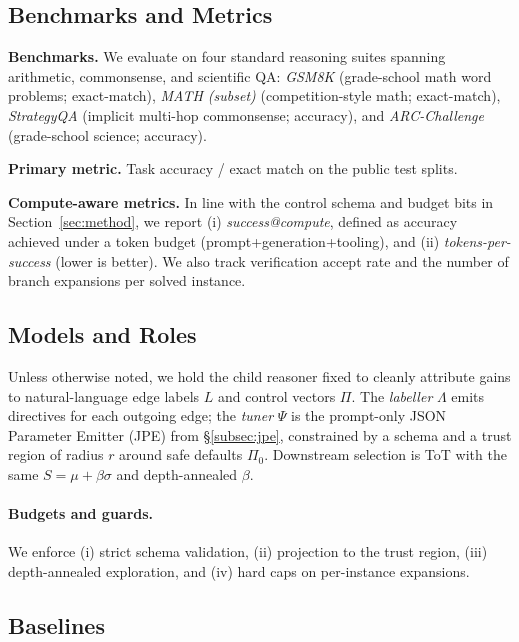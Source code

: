\documentclass{article}
\theoremstyle{plain}
\theoremstyle{definition}
\theoremstyle{remark}
\begin{document}
\subsection{Benchmarks and Metrics}

\textbf{Benchmarks.} We evaluate on four standard reasoning suites spanning arithmetic, commonsense, and scientific QA: 
\emph{GSM8K} (grade-school math word problems; exact-match), 
\emph{MATH (subset)} (competition-style math; exact-match), 
\emph{StrategyQA} (implicit multi-hop commonsense; accuracy), and 
\emph{ARC-Challenge} (grade-school science; accuracy).

\noindent\textbf{Primary metric.} Task accuracy / exact match on the public test splits.

\noindent\textbf{Compute-aware metrics.} In line with the control schema and budget bits in Section~\ref{sec:method}, 
we report (i) \emph{success@compute}, defined as accuracy achieved under a token budget (prompt{+}generation{+}tooling), and 
(ii) \emph{tokens-per-success} (lower is better). We also track verification accept rate and the number of branch expansions per solved instance.

\subsection{Models and Roles}

Unless otherwise noted, we hold the child reasoner fixed to cleanly attribute gains to natural-language edge labels $L$ and control vectors $\Pi$. 
The \emph{labeller} $\Lambda$ emits directives for each outgoing edge; the \emph{tuner} $\Psi$ is the prompt-only JSON Parameter Emitter (JPE) from \S\ref{subsec:jpe}, constrained by a schema and a trust region of radius $r$ around safe defaults $\Pi_0$. 
Downstream selection is ToT with the same $S=\mu+\beta\sigma$ and depth-annealed $\beta$.

\paragraph{Budgets and guards.} We enforce (i) strict schema validation, (ii) projection to the trust region, (iii) depth-annealed exploration, and (iv) hard caps on per-instance expansions.

\subsection{Baselines}
\end{document}
